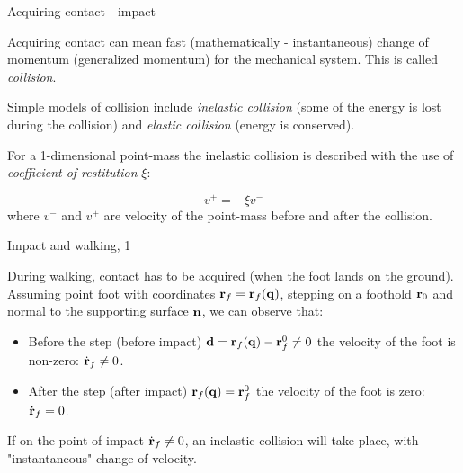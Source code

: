 \documentclass{beamer}
\begin{document}
\begin{frame}{Acquiring contact - impact}
	\begin{flushleft}
		
		Acquiring contact can mean fast (mathematically - instantaneous) change of momentum (generalized momentum) for the mechanical system. This is called \emph{collision}.
		
		\bigskip
		
		Simple models of collision include \emph{inelastic collision} (some of the energy is lost during the collision) and \emph{elastic collision} (energy is conserved).
		
		\bigskip
		
		For a 1-dimensional point-mass the inelastic collision is described with the use of \emph{coefficient of restitution} $\xi$:
		
		\begin{equation}
			v^+ = -\xi v^-
		\end{equation}
		where $v^-$ and $v^+$ are velocity of the point-mass before and after the collision.
		
	\end{flushleft}
\end{frame}




\begin{frame}{Impact and walking, 1}
	\begin{flushleft}
		
		During walking, contact has to be acquired (when the foot lands on the ground). Assuming point foot with coordinates $\mathbf{r}_f = \mathbf{r}_f(\mathbf{q})$, stepping on a foothold $\mathbf{r}_0$ and normal to the supporting surface $\mathbf{n}$, we can observe that:
		
		\bigskip
		
		\begin{itemize}
			\item Before the step (before impact) $\mathbf{d} = \mathbf{r}_f(\mathbf{q}) - \mathbf{r}_f^0 \neq 0$ the velocity of the foot is non-zero: $\dot{\mathbf{r}}_f \neq 0$. 
			
			\item After the step (after impact) $\mathbf{r}_f(\mathbf{q}) = \mathbf{r}_f^0$ the velocity of the foot is zero: $\dot{\mathbf{r}}_f = 0$. 
		\end{itemize}
	
		If on the point of impact $\dot{\mathbf{r}}_f \neq 0$, an inelastic collision will take place, with "instantaneous" change of velocity.
		
	\end{flushleft}
\end{frame}
\end{document}
